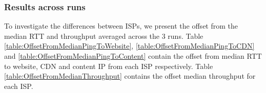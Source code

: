 \documentclass{sig-alternate-05-2015}
\begin{document}
\subsubsection{Results across runs}
To investigate the differences between ISPs, we present the offset from the median RTT and throughput averaged across the 3 runs. Table \ref{table:OffsetFromMedianPingToWebsite}, \ref{table:OffsetFromMedianPingToCDN} and \ref{table:OffsetFromMedianPingToContent} contain the offset from median RTT to website, CDN and content IP from each ISP respectively. Table \ref{table:OffsetFromMedianThroughput} contains the offset median throughput for each ISP.

\begin{table}
	\caption{Offset from median RTT to website (ms, lower is better)}
	\label{table:OffsetFromMedianPingToWebsite}
\end{table}

\begin{table}
	\caption{Offset from median RTT to CDN (ms, lower is better)}
	\label{table:OffsetFromMedianPingToCDN}
\end{table}
\end{document}
